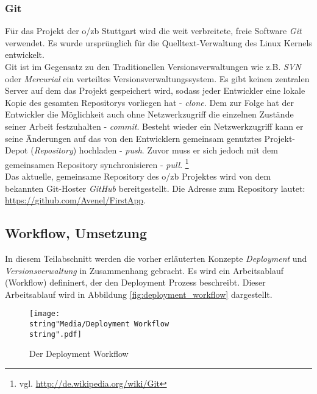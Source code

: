 \documentclass[12pt,             %
               a4paper,          %
               listof=totoc,     %
               index=totoc,      %
               bibliography=totoc,%
               oneside,         %
               BCOR1cm,          %
               english   %
               ]{scrbook}
\begin{document}
\subsubsection{Git}
Für das Projekt der o/zb Stuttgart wird die weit verbreitete, freie Software \textit{Git} verwendet. Es wurde ursprünglich für die Quelltext-Verwaltung des Linux Kernels entwickelt.\\
Git ist im Gegensatz zu den Traditionellen Versionsverwaltungen wie z.B. \textit{SVN} oder \textit{Mercurial} ein verteiltes Versionsverwaltungssystem. Es gibt keinen zentralen Server auf dem das Projekt gespeichert wird, sodass jeder Entwickler eine lokale Kopie des gesamten Repositorys vorliegen hat - \textit{clone}. Dem zur Folge hat der Entwickler die Möglichkeit auch ohne Netzwerkzugriff die einzelnen Zustände seiner Arbeit festzuhalten - \textit{commit}. Besteht wieder ein Netzwerkzugriff kann er seine Änderungen auf das von den Entwicklern gemeinsam genutztes Projekt-Depot (\textit{Repository}) hochladen - \textit{push}. Zuvor muss er sich jedoch mit dem gemeinsamen Repository synchronisieren - \textit{pull}. \footnote{vgl. \url{http://de.wikipedia.org/wiki/Git}}\\

Das aktuelle, gemeinsame Repository des o/zb Projektes wird von dem bekannten Git-Hoster \textit{GitHub} bereitgestellt. Die Adresse zum Repository lautet: \url{https://github.com/Avenel/FirstApp}.

\subsection{Workflow, Umsetzung}
In diesem Teilabschnitt werden die vorher erläuterten Konzepte \textit{Deployment} und \textit{Versionsverwaltung} in Zusammenhang gebracht. Es wird ein Arbeitsablauf (\glqq Workflow\grqq) defininert, der den Deployment Prozess beschreibt. Dieser Arbeitsablauf wird in Abbildung \vref{fig:deployment_workflow} dargestellt.

\begin{figure}[H]
     \begin{center}
          \texttt{[image: \\string"Media/Deployment Workflow\\string".pdf]}
     \end{center}
     \caption{Der Deployment Workflow}
     \label{fig:deployment_workflow}
\end{figure} 
\end{document}
